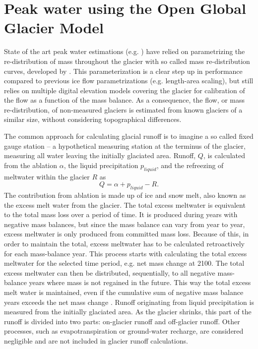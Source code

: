 \documentclass[12pt, a4paper]{article}
\begin{document}
\section{Peak water using the Open Global Glacier Model}
State of the art peak water estimations (e.g.
\cite{rounceGlacierMassChange2020,hussGlobalscaleHydrologicalResponse2018}) have
relied on parametrizing the re-distribution of mass throughout the glacier with
so called mass re-distribution curves, developed by
\textcite{hussFutureHighmountainHydrology2010}. This parameterization is a clear
step up in performance compared to previous ice flow parametrizations (e.g.
length-area scaling), but still relies on multiple digital elevation models
covering the glacier for calibration of the flow as a function of the mass
balance. As a consequence, the flow, or mass re-distribution, of non-measured
glaciers is estimated from known glaciers of a similar size, without
considering topographical differences. 

The common approach for calculating glacial runoff is to imagine a so called
fixed gauge station -- a hypothetical measuring station at the terminus of the
glacier, measuring all water leaving the initially glaciated area. Runoff, $Q$,
is calculated from the ablation $\alpha$, the liquid precipitation $p_{liquid}$,
and the refreezing of meltwater within the glacier $R$ as
\begin{equation}
    Q = \alpha + p_{liquid} - R.
\end{equation}
The contribution from ablation is made up of ice and snow melt, also known as
the excess melt water from the glacier. The total excess meltwater is equivalent
to the total mass loss over a period of time. It is produced during years with
negative mass balances, but since the mass balance can vary from year to year,
excess meltwater is only produced from committed mass loss. Because of this, in
order to maintain the total, excess meltwater has to be calculated retroactively
for each mass-balance year. This process starts with calculating the total
excess meltwater for the selected time period, e.g. net mass change at 2100. The
total excess meltwater can then be distributed, sequentially, to all negative
mass-balance years where mass is not regained in the future. This way the total
excess melt water is maintained, even if the cumulative sum of negative mass
balance years exceeds the net mass change
\parencite{rounceGlacierMassChange2020}. Runoff originating from liquid
precipitation is measured from the initially glaciated area. As the glacier
shrinks, this part of the runoff is divided into two parts: on-glacier runoff
and off-glacier runoff. Other processes, such as evapotranspiration or
ground-water recharge, are considered negligible and are not included in glacier
runoff calculations.
\end{document}
